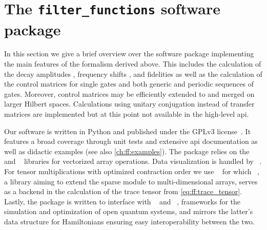 \chapter{The \texttt{filter\_functions} software package}\label{ch:ff:software}
In this section we give a brief overview over the \filterfunctions software package implementing the main features of the formalism derived above.
This includes the calculation of the decay amplitudes \decayamps, frequency shifts \freqshifts, and fidelities as well as the calculation of the control matrices for single gates and both generic and periodic sequences of gates.
Moreover, control matrices may be efficiently extended to and merged on larger Hilbert spaces.
Calculations using unitary conjugation instead of transfer matrices are implemented but at this point not available in the high-level \gls{api}.

Our software is written in Python and published under the GPLv3 license~\cite{Hangleiter_ff}.
It features a broad coverage through unit tests and extensive \gls{api} documentation as well as didactic examples (see also \cref{ch:ff:examples}).
The package relies on the \numpy~\cite{Harris2020} and \scipy~\cite{Virtanen2020} libraries for vectorized array operations.
Data visualization is handled by \matplotlib~\cite{Hunter2007}.
For tensor multiplications with optimized contraction order we use \opteinsum~\cite{Smith2018} for which \sparse~\cite{Pydata2019}, a library aiming to extend the \scipy sparse module to multi-dimensional arrays, serves as a backend in the calculation of the trace tensor from \cref{eq:ff:trace_tensor}.
Lastly, the package is written to interface with \qopt~\cite{Teske2022} and \qutip~\cite{Johansson2012}, frameworks for the simulation and optimization of open quantum systems, and mirrors the latter's data structure for Hamiltonians ensuring easy interoperability between the two.

